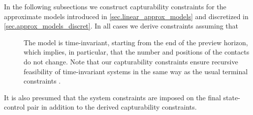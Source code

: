 In the following subsections we construct capturability constraints for the
approximate models introduced in \cref{sec.linear_approx_models} and
discretized in \cref{sec.approx_models_discret}. In all cases we derive
constraints assuming that
%
\begin{description}
    \item[] The model is time-invariant, starting from
        the end of the preview horizon, which implies, in particular, that the
        number and positions of the contacts do not change. Note that our
        capturability constraints ensure recursive feasibility of
        time-invariant systems in the same way as the usual terminal
        constraints \cite{Mayne2000automatica}.
\end{description}
%
It is also presumed that the system constraints are imposed on the final
state-control pair in addition to the derived capturability constraints.



